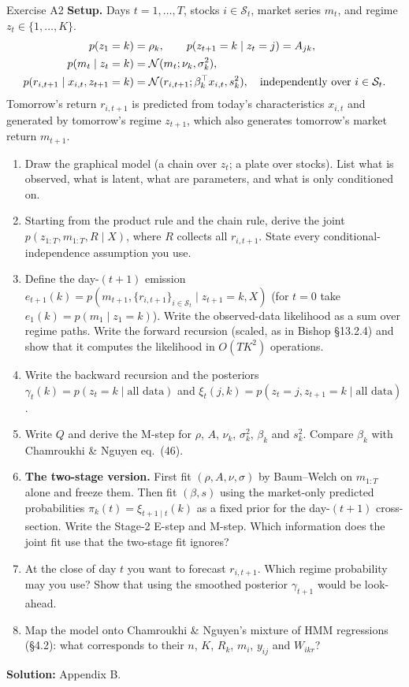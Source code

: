 \begin{exercise}{Exercise A2}
\textbf{Setup.} Days $t=1,\dots,T$, stocks $i\in\mathcal S_t$, market series $m_t$, and regime $z_t\in\{1,\dots,K\}$.
\begin{align*}
p(z_1=k)&=\rho_k, \qquad p(z_{t+1}=k\mid z_t=j)=A_{jk},\\
p(m_t\mid z_t=k)&=\mathcal{N}(m_t;\nu_k,\sigma_k^2),\\
p(r_{i,t+1}\mid x_{i,t},z_{t+1}=k)&=\mathcal{N}(r_{i,t+1};\beta_k^{\top} x_{i,t},s_k^2),\quad\text{independently over } i\in\mathcal S_t.
\end{align*}
Tomorrow's return $r_{i,t+1}$ is predicted from today's characteristics $x_{i,t}$ and generated by tomorrow's regime $z_{t+1}$, which also generates tomorrow's market return $m_{t+1}$.
\begin{enumerate}[label=(\alph*)]
\item Draw the graphical model (a chain over $z_t$; a plate over stocks). List what is observed, what is latent, what are parameters, and what is only conditioned on.
\item Starting from the product rule and the chain rule, derive the joint $p(z_{1:T},m_{1:T},R\mid X)$, where $R$ collects all $r_{i,t+1}$. State every conditional-independence assumption you use.
\item Define the day-$(t{+}1)$ emission $e_{t+1}(k)=p(m_{t+1},\{r_{i,t+1}\}_{i\in\mathcal S_t}\mid z_{t+1}=k,X)$ (for $t=0$ take $e_1(k)=p(m_1\mid z_1=k)$). Write the observed-data likelihood as a sum over regime paths. Write the forward recursion (scaled, as in Bishop \S13.2.4) and show that it computes the likelihood in $O(TK^2)$ operations.
\item Write the backward recursion and the posteriors $\gamma_t(k)=p(z_t=k\mid\text{all data})$ and $\xi_t(j,k)=p(z_t=j,z_{t+1}=k\mid\text{all data})$.
\item Write $Q$ and derive the M-step for $\rho$, $A$, $\nu_k$, $\sigma_k^2$, $\beta_k$ and $s_k^2$. Compare $\beta_k$ with Chamroukhi \& Nguyen eq.~(46).
\item \textbf{The two-stage version.} First fit $(\rho,A,\nu,\sigma)$ by Baum--Welch on $m_{1:T}$ alone and freeze them. Then fit $(\beta,s)$ using the market-only predicted probabilities $\pi_k(t)=\xi_{t+1\mid t}(k)$ as a fixed prior for the day-$(t{+}1)$ cross-section. Write the Stage-2 E-step and M-step. Which information does the joint fit use that the two-stage fit ignores?
\item At the close of day $t$ you want to forecast $r_{i,t+1}$. Which regime probability may you use? Show that using the smoothed posterior $\gamma_{t+1}$ would be look-ahead.
\item Map the model onto Chamroukhi \& Nguyen's mixture of HMM regressions (\S4.2): what corresponds to their $n$, $K$, $R_k$, $m_i$, $y_{ij}$ and $W_{ikr}$?
\end{enumerate}
\textbf{Solution:} Appendix B.
\end{exercise}
\newpage
